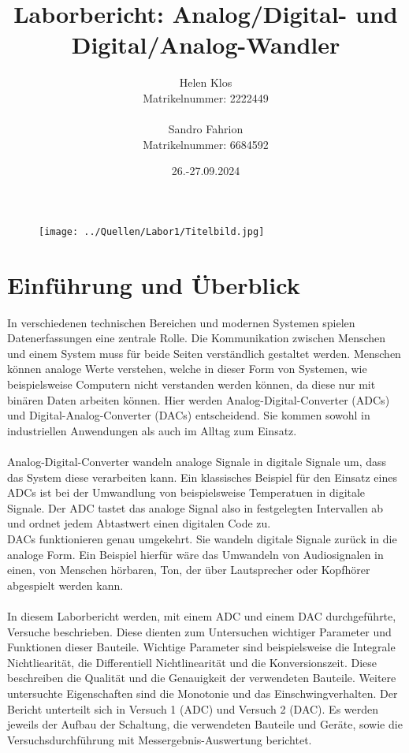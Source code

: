 \documentclass[a4paper,12pt]{article}
\title{Laborbericht: Analog/Digital- und Digital/Analog-Wandler}
\author{Helen Klos \\Matrikelnummer: 2222449 \\ \\Sandro Fahrion \\Matrikelnummer: 6684592}
\date{26.-27.09.2024}
\begin{document}
\sloppy
\setlength{\emergencystretch}{5pt}

\maketitle

\begin{figure}[H]
    \centering
    \texttt{[image: ../Quellen/Labor1/Titelbild.jpg]}
\end{figure}
\newpage
\tableofcontents
\newpage

\section{Einführung und Überblick}
In verschiedenen technischen Bereichen und modernen Systemen spielen Datenerfassungen eine zentrale Rolle. Die Kommunikation zwischen Menschen und einem System muss für beide Seiten verständlich gestaltet werden. Menschen können analoge Werte verstehen, welche in dieser Form von Systemen, wie beispielsweise Computern nicht verstanden werden können, da diese nur mit binären Daten arbeiten können. Hier werden Analog-Digital-Converter (ADCs) und Digital-Analog-Converter (DACs) entscheidend. Sie kommen sowohl in industriellen Anwendungen als auch im Alltag zum Einsatz.\\\\
Analog-Digital-Converter wandeln analoge Signale in digitale Signale um, dass das System diese verarbeiten kann. Ein klassisches Beispiel für den Einsatz eines ADCs ist bei der Umwandlung von beispielsweise Temperatuen in digitale Signale. Der ADC tastet das analoge Signal also in festgelegten Intervallen ab und ordnet jedem Abtastwert einen digitalen Code zu.\\
DACs funktionieren genau umgekehrt. Sie wandeln digitale Signale zurück in die analoge Form. Ein Beispiel hierfür wäre das Umwandeln von Audiosignalen in einen, von Menschen hörbaren, Ton, der über Lautsprecher oder Kopfhörer abgespielt werden kann.\\\\
In diesem Laborbericht werden, mit einem ADC und einem DAC durchgeführte, Versuche beschrieben. Diese dienten zum Untersuchen wichtiger Parameter und Funktionen dieser Bauteile. Wichtige Parameter sind beispielsweise die Integrale Nichtliearität, die Differentiell Nichtlinearität und die Konversionszeit. Diese beschreiben die Qualität und die Genauigkeit der verwendeten Bauteile. Weitere untersuchte Eigenschaften sind die Monotonie und das Einschwingverhalten. Der Bericht unterteilt sich in Versuch 1 (ADC) und Versuch 2 (DAC). Es werden jeweils der Aufbau der Schaltung, die verwendeten Bauteile und Geräte, sowie die Versuchsdurchführung mit Messergebnis-Auswertung berichtet.
\newpage
\end{document}
